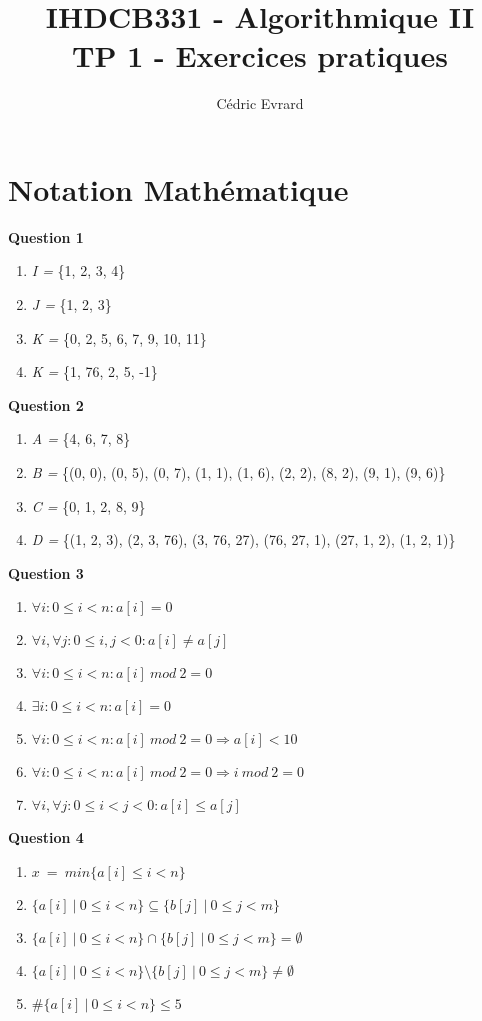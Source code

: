 \documentclass[11pt]{article}
\title{IHDCB331 - Algorithmique II\\
	\large{TP 1 - Exercices pratiques}
}
\author{Cédric Evrard}
\begin{document}
\maketitle

\section{Notation Mathématique}

\textbf{Question 1}
\begin{enumerate}
	\item \textit{I =} \{1, 2, 3, 4\}
	\item \textit{J =} \{1, 2, 3\} 
	\item \textit{K =} \{0, 2, 5, 6, 7, 9, 10, 11\}
	\item \textit{K =} \{1, 76, 2, 5, -1\} 
\end{enumerate}
\textbf{Question 2}
\begin{enumerate}
	\item \textit{A =} \{4, 6, 7, 8\}
	\item \textit{B =} \{(0, 0), (0, 5), (0, 7), (1, 1), (1, 6), (2, 2), (8, 2), (9, 1), (9, 6)\}
	\item \textit{C =} \{0, 1, 2, 8, 9\}
	\item \textit{D =} \{(1, 2, 3), (2, 3, 76), (3, 76, 27), (76, 27, 1), (27, 1, 2), (1, 2, 1)\}
\end{enumerate}
\textbf{Question 3}
\begin{enumerate}
	\item $\forall i : 0 \leq i < n : a[i] = 0$
	\item $\forall i, \forall j : 0 \leq i, j < 0 : a[i] \neq a[j]$
	\item $\forall i : 0 \leq i < n : a[i]\ mod\ 2 = 0$
	\item $\exists i : 0 \leq i < n : a[i] = 0$
	\item $\forall i : 0 \leq i < n : a[i]\ mod\ 2 = 0 \Rightarrow a[i] < 10  $
	\item $\forall i : 0 \leq i < n : a[i]\ mod\ 2 = 0 \Rightarrow i\ mod\ 2 = 0$
	\item $\forall i, \forall j : 0 \leq i < j < 0 : a[i] \leq a[j]$
\end{enumerate}
\textbf{Question 4}
\begin{enumerate}
	\item $x\ =\ min\{a[i] \leq i < n \}$ 
	\item $\{a[i]\ |\ 0 \leq i < n \} \subseteq \{b[j]\ |\ 0 \leq j < m \}$
	\item $\{a[i]\ |\ 0 \leq i < n \} \cap \{b[j]\ |\ 0 \leq j < m \} = \emptyset$  
	\item $\{a[i]\ |\ 0 \leq i < n \} \setminus \{b[j]\ |\ 0 \leq j < m \} \neq \emptyset$ 
	\item $\#\{a[i]\ |\ 0 \leq i < n \} \leq 5$
\end{enumerate}
\end{document}

